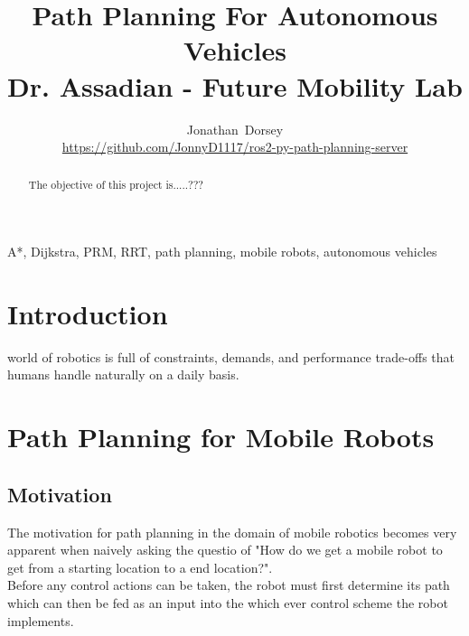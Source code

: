 \documentclass[journal]{IEEEtran}
\begin{document}
\title{Path Planning For Autonomous Vehicles \\ Dr. Assadian - Future Mobility Lab}


\author{Jonathan~Dorsey  \\  \url{https://github.com/JonnyD1117/ros2-py-path-planning-server}}


%

\maketitle



\begin{abstract}
  The objective of this project is.....???
\end{abstract}

\begin{IEEEkeywords}
	A*, Dijkstra, PRM, RRT, path planning, mobile robots, autonomous vehicles
\end{IEEEkeywords}


\IEEEpeerreviewmaketitle

\section{Introduction}

 world of robotics is full of constraints, demands, and performance trade-offs that humans handle naturally on a daily basis.

\section{Path Planning for Mobile Robots}


\subsection{Motivation}
The motivation for path planning in the domain of mobile robotics becomes very apparent when naively asking the questio of "How do we get a mobile robot to get from a starting location to a end location?". \\

Before any control actions can be taken, the robot must first determine its path which can then be fed as an input into the which ever control scheme the robot implements. 
\end{document}
